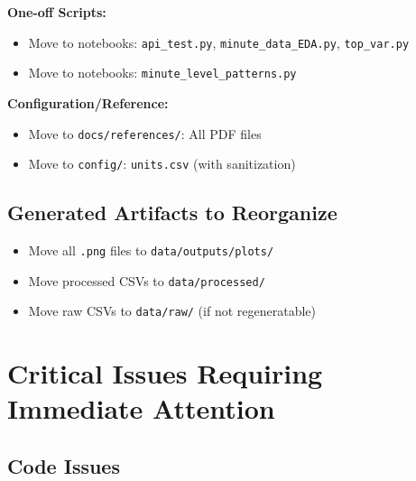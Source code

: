 \documentclass[11pt,a4paper]{article}
\begin{document}
\textbf{One-off Scripts:}
\begin{itemize}
    \item Move to notebooks: \texttt{api\_test.py}, \texttt{minute\_data\_EDA.py}, \texttt{top\_var.py}
    \item Move to notebooks: \texttt{minute\_level\_patterns.py}
\end{itemize}

\textbf{Configuration/Reference:}
\begin{itemize}
    \item Move to \texttt{docs/references/}: All PDF files
    \item Move to \texttt{config/}: \texttt{units.csv} (with sanitization)
\end{itemize}

\subsection{Generated Artifacts to Reorganize}

\begin{itemize}
    \item Move all \texttt{.png} files to \texttt{data/outputs/plots/}
    \item Move processed CSVs to \texttt{data/processed/}
    \item Move raw CSVs to \texttt{data/raw/} (if not regeneratable)
\end{itemize}

\section{Critical Issues Requiring Immediate Attention}

\subsection{Code Issues}
\end{document}
